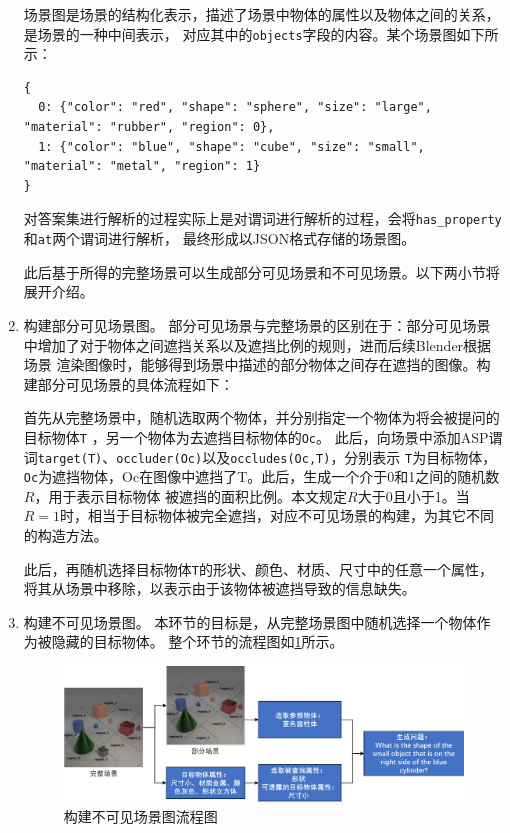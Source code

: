 \begin{enumerate}[nosep]
场景图是场景的结构化表示，描述了场景中物体的属性以及物体之间的关系，是场景的一种中间表示，
对应其中的\texttt{objects}字段的内容。某个场景图如下所示：
\begin{lstlisting}
{
  0: {"color": "red", "shape": "sphere", "size": "large", "material": "rubber", "region": 0},
  1: {"color": "blue", "shape": "cube", "size": "small", "material": "metal", "region": 1}
}
\end{lstlisting}

对答案集进行解析的过程实际上是对谓词进行解析的过程，会将\texttt{has\_property}和\texttt{at}两个谓词进行解析，
最终形成以JSON格式存储的场景图。

此后基于所得的完整场景可以生成部分可见场景和不可见场景。以下两小节将展开介绍。
\item 构建部分可见场景图。
部分可见场景与完整场景的区别在于：部分可见场景中增加了对于物体之间遮挡关系以及遮挡比例的规则，进而后续Blender根据场景
渲染图像时，能够得到场景中描述的部分物体之间存在遮挡的图像。构建部分可见场景的具体流程如下：

首先从完整场景中，随机选取两个物体，并分别指定一个物体为将会被提问的目标物体\texttt{T}
，另一个物体为去遮挡目标物体的\texttt{Oc}。
此后，向场景中添加ASP谓词\texttt{target(T)}、\texttt{occluder(Oc)}以及\texttt{occludes(Oc,T)}，分别表示
\texttt{T}为目标物体，\texttt{Oc}为遮挡物体，Oc在图像中遮挡了T。此后，生成一个介于0和1之间的随机数$R$，用于表示目标物体
被遮挡的面积比例。本文规定$R$大于0且小于1。当$R=1$时，相当于目标物体被完全遮挡，对应不可见场景的构建，为其它不同的构造方法。

此后，再随机选择目标物体\texttt{T}的形状、颜色、材质、尺寸中的任意一个属性，将其从场景中移除，以表示由于该物体被遮挡导致的信息缺失。
\item 构建不可见场景图。
本环节的目标是，从完整场景图中随机选择一个物体作为被隐藏的目标物体。
整个环节的流程图如\ref{generate-partial-scenes-and-questions}所示。
\begin{figure}[h]
\centering
\includegraphics[scale=0.6]{figures/部分场景及问题生成-crop.pdf}
\caption{构建不可见场景图流程图}
\label{generate-partial-scenes-and-questions}
\end{figure}


\end{enumerate}
